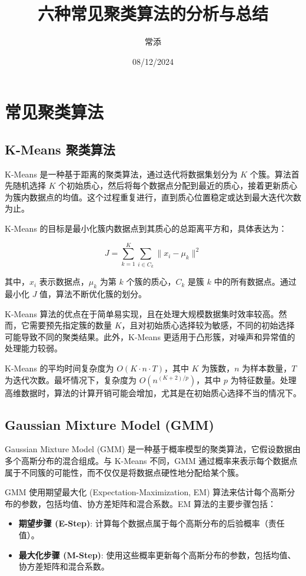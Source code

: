 \documentclass{ctexart} %
\title{六种常见聚类算法的分析与总结} %
\author{常添} %
\date{08/12/2024} %
\begin{document}
\maketitle %

\section{常见聚类算法}

\subsection{K-Means 聚类算法}

K-Means 是一种基于距离的聚类算法，通过迭代将数据集划分为 \(K\) 个簇。算法首先随机选择 \(K\) 个初始质心，然后将每个数据点分配到最近的质心，接着更新质心为簇内数据点的均值。这个过程重复进行，直到质心位置稳定或达到最大迭代次数为止。

K-Means 的目标是最小化簇内数据点到其质心的总距离平方和，具体表达为：

\[
J = \sum_{k=1}^{K} \sum_{i \in C_k} \| x_i - \mu_k \|^2
\]

其中，\(x_i\) 表示数据点，\(\mu_k\) 为第 \(k\) 个簇的质心，\(C_k\) 是簇 \(k\) 中的所有数据点。通过最小化 \(J\) 值，算法不断优化簇的划分。

K-Means 算法的优点在于简单易实现，且在处理大规模数据集时效率较高。然而，它需要预先指定簇的数量 \(K\)，且对初始质心选择较为敏感，不同的初始选择可能导致不同的聚类结果。此外，K-Means 更适用于凸形簇，对噪声和异常值的处理能力较弱。

K-Means 的平均时间复杂度为 \(O(K \cdot n \cdot T)\)，其中 \(K\) 为簇数，\(n\) 为样本数量，\(T\) 为迭代次数。最坏情况下，复杂度为 \(O(n^{(K+2)/p})\)，其中 \(p\) 为特征数量。处理高维数据时，算法的计算开销可能会增加，尤其是在初始质心选择不当的情况下。

\subsection{Gaussian Mixture Model (GMM)}

Gaussian Mixture Model (GMM) 是一种基于概率模型的聚类算法，它假设数据由多个高斯分布的混合组成。与 K-Means 不同，GMM 通过概率来表示每个数据点属于不同簇的可能性，而不仅仅是将数据点硬性地分配给某个簇。

GMM 使用期望最大化 (Expectation-Maximization, EM) 算法来估计每个高斯分布的参数，包括均值、协方差矩阵和混合系数。EM 算法的主要步骤包括：

\begin{itemize}
    \item \textbf{期望步骤 (E-Step)}: 计算每个数据点属于每个高斯分布的后验概率（责任值）。
    \item \textbf{最大化步骤 (M-Step)}: 使用这些概率更新每个高斯分布的参数，包括均值、协方差矩阵和混合系数。
\end{itemize}
\end{document}
